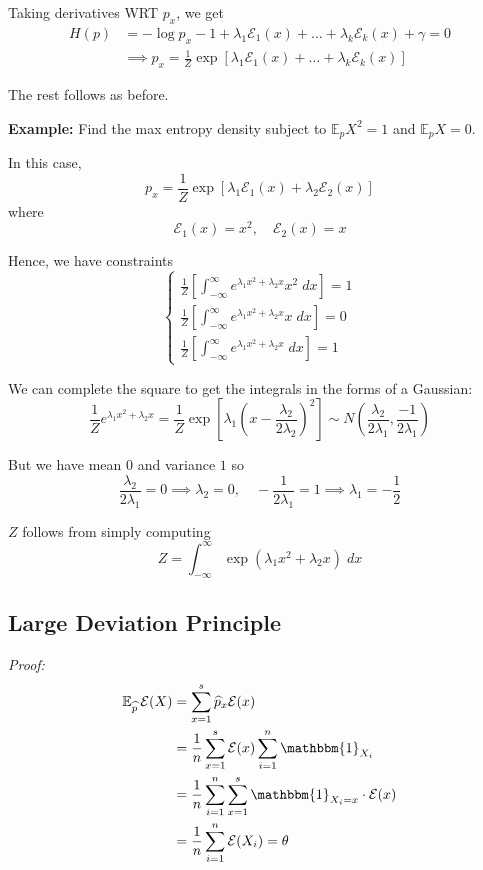 \documentclass[12pt]{report}
\renewcommand{\hat}[1]{\widehat{#1}}
\newcommand{\R}{\mathbb{R}}
\newcommand{\E}{\mathbb{E}}
\newcommand{\ind}{\mathbbm{1}}
\newcommand{\Ec}{\mathcal{E}}
\newcommand*{\tbf}[1]{\ifmmode\mathbf{#1}\else\textbf{#1}\fi}
\newenvironment*{tbox}[2][gray]{
    \begin{tcolorbox}[
        parbox=false,
        colback=#1!5!white,
        colframe=#1!75!black,
        breakable,
        title={#2}
    ]}
    {\end{tcolorbox}}
\begin{document}
Taking derivatives WRT $p_x$, we get
\begin{align*}
	H(p) & = -\log p_x - 1 + \lambda_1 \Ec_1(x) + \dots + \lambda_k \Ec_k(x) + \gamma = 0              \\
	     & \implies p_x = \frac{1}{Z} \exp\left[\lambda_1 \Ec_1(x) + \dots + \lambda_k \Ec_k(x)\right]
\end{align*}

The rest follows as before.

\tbf{Example:} Find the max entropy density subject to $\E_p X^2 = 1$ and $\E_p X = 0$.

In this case,
\[p_x = \frac{1}{Z} \exp\left[\lambda_1 \Ec_1(x) + \lambda_2 \Ec_2(x)\right]\]
where
\[\Ec_1(x) = x^2, \quad \Ec_2(x) = x\]

Hence, we have constraints
\[\begin{cases}
		\frac{1}{Z} \left[\int_{-\infty}^{\infty} e^{\lambda_1 x^2 + \lambda_2 x} x^2\; dx\right] = 1 \\
		\frac{1}{Z} \left[\int_{-\infty}^{\infty} e^{\lambda_1 x^2 + \lambda_2 x} x\; dx\right] = 0   \\
		\frac{1}{Z} \left[\int_{-\infty}^{\infty} e^{\lambda_1 x^2 + \lambda_2 x}\; dx\right] = 1
	\end{cases}\]

We can complete the square to get the integrals in the forms of a Gaussian:
\[\frac{1}{Z}e^{\lambda_1 x^2  +\lambda_2 x} = \frac{1}{Z}\exp\left[\lambda_1 \left(x - \frac{\lambda_2}{2\lambda_2}\right)^2 \right] \sim N(\frac{\lambda_2}{2\lambda_1}, \frac{-1}{2\lambda_1})\]

But we have mean $0$ and variance $1$ so
\[\frac{\lambda_2}{2\lambda_1} = 0 \implies \lambda_2 = 0, \quad -\frac{1}{2\lambda_1} = 1 \implies \lambda_1 = -\frac{1}{2}\]

$Z$ follows from simply computing
\[Z = \int_{-\infty}^{\infty} \exp(\lambda_1 x^2 + \lambda_2 x)\; dx\]

\subsection{Large Deviation Principle}

\begin{tbox}{\textbf{Large Deviation Principle:} Take $p$ on $\{1, 2, \dots, s\}$, $\Ec: \{1, \dots, s\} \to \R$. Observe $X_1, X_2, \, \dots,\, X_n \overset{\text{iid}}{\sim} p$. Define
		\[\frac{1}{n}\sum_{x=1}^n \Ec(X_k) = \theta\]. Define the empirical distribution $\hat p_x = \frac{1}{n}\cdot \#\{i: X_i = x\}$. Then $\E_{\hat p}\, \Ec(X) = \theta$}

	\emph{Proof:}
	\begin{align*}
		\E_{\hat p}\, \Ec(X) & = \sum_{x=1}^s \hat p_x \Ec(x)                                   \\
		                     & = \frac{1}{n}\sum_{x=1}^s \Ec(x) \sum_{i=1}^n \ind_{X_i}         \\
		                     & = \frac{1}{n}\sum_{i=1}^n \sum_{x=1}^s \ind_{X_i=x} \cdot \Ec(x) \\
		                     & = \frac{1}{n} \sum_{i=1}^{n} \Ec(X_i) = \theta
	\end{align*}
\end{tbox}
\end{document}
